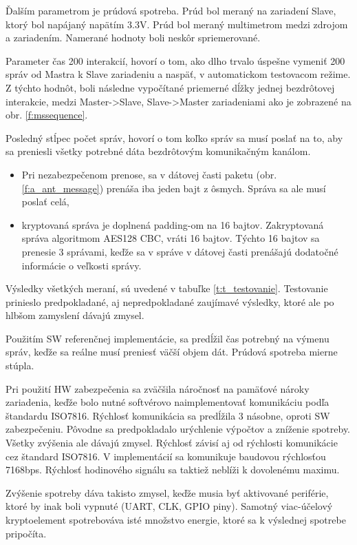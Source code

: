 \documentclass[12pt,a4paper,oneside,openright]{report}
\begin{document}
Ďalším parametrom je prúdová spotreba. Prúd bol meraný na zariadení Slave, ktorý bol napájaný napätím 3.3V. Prúd bol meraný multimetrom medzi zdrojom a zariadením. Namerané hodnoty  boli neskôr spriemerované.

Parameter čas 200 interakcií, hovorí o tom, ako dlho trvalo úspešne vymeniť 200 správ od Mastra k Slave zariadeniu a naspäť, v automatickom testovacom režime. Z týchto hodnôt, boli následne vypočítané priemerné dĺžky jednej bezdrôtovej interakcie, medzi Master-\textgreater Slave, Slave-\textgreater Master zariadeniami ako je zobrazené na obr. \ref{f:mssequence}.

Posledný stĺpec počet správ, hovorí o tom koľko správ sa musí poslať na to, aby sa preniesli všetky potrebné dáta bezdrôtovým komunikačným kanálom. 
\begin{itemize}
	\item Pri nezabezpečenom prenose, sa v dátovej časti paketu (obr. \ref{f:a_ant_message}) prenáša iba jeden bajt z ôsmych. Správa sa ale musí poslať celá,
	\item kryptovaná správa je doplnená padding-om na 16 bajtov. Zakryptovaná správa algoritmom AES128 CBC, vráti 16 bajtov. Týchto 16 bajtov sa prenesie 3 správami, keďže sa v správe v dátovej časti prenášajú dodatočné informácie o veľkosti správy.
\end{itemize}
\onehalfspacing

Výsledky všetkých meraní, sú uvedené v tabuľke \ref{t:t_testovanie}. Testovanie prinieslo predpokladané, aj nepredpokladané zaujímavé výsledky, ktoré ale po hlbšom zamyslení dávajú zmysel.

Použitím SW referenčnej implementácie, sa predĺžil čas potrebný na výmenu správ, keďže sa reálne musí preniesť väčší objem dát. Prúdová spotreba mierne stúpla.

Pri použití HW zabezpečenia sa zväčšila náročnosť na pamäťové nároky zariadenia, keďže bolo nutné softvérovo naimplementovať komunikáciu podľa štandardu ISO7816.
Rýchlosť komunikácia sa predĺžila 3 násobne, oproti SW zabezpečeniu. Pôvodne sa predpokladalo urýchlenie výpočtov a zníženie spotreby. Všetky zvýšenia ale dávajú zmysel. Rýchlosť závisí aj od rýchlosti komunikácie cez štandard ISO7816. V implementácií sa komunikuje baudovou rýchlosťou 7168bps. Rýchlosť hodinového signálu sa taktiež neblíži k dovolenému maximu.

Zvýšenie spotreby dáva takisto zmysel, keďže musia byť aktivované periférie, ktoré by inak boli vypnuté (UART, CLK, GPIO piny). Samotný viac-účelový kryptoelement spotrebováva isté množstvo energie, ktoré sa k výslednej spotrebe pripočíta.
\end{document}
